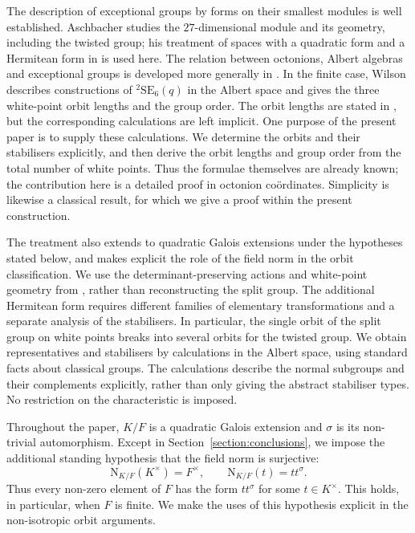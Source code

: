 \documentclass{amsart}
\def\NN{\mathord{\mathrm{N}}}
\newcommand{\SE}{\mathrm{SE}}
\newcommand{\s}{\sigma}
\theoremstyle{plain}
\numberwithin{theorem}{section}
\theoremstyle{definition}
\begin{document}
The description of exceptional groups by forms on their smallest
modules is well established. Aschbacher \cite{Asch1} studies the
$27$-dimensional module and its geometry, including the twisted group;
his treatment of spaces with a quadratic form and a Hermitean form in
\cite[Section~10]{Asch1} is used here. The relation between octonions,
Albert algebras and exceptional groups is developed more generally in
\cite{SprVeld}. In the finite case, Wilson
\cite[Sections~9--10]{WilsonAlbert} describes constructions of
${}^2\SE_6(q)$ in the Albert space and gives the three white-point orbit
lengths and the group order. The orbit lengths are stated in
\cite[Section~10]{WilsonAlbert}, but the corresponding calculations
are left implicit. One purpose of the present paper is to supply these
calculations. We determine the orbits and their stabilisers explicitly,
and then derive the orbit lengths and group order from the total
number of white points. Thus the formulae themselves are already
known; the contribution here is a detailed proof in octonion
co\"ordinates. Simplicity is likewise a classical result, for which we
give a proof within the present construction.

The treatment also extends to quadratic Galois extensions under the
hypotheses stated below, and makes explicit the role of the field norm
in the orbit classification.
We use the determinant-preserving actions and white-point geometry
from \cite{BSW1}, rather than reconstructing the split group. The
additional Hermitean form requires different families of elementary
transformations and a separate analysis of the stabilisers. In
particular, the single orbit of the split group on white points breaks
into several orbits for the twisted group. We obtain representatives
and stabilisers by calculations in the Albert space, using standard
facts about classical groups. The calculations describe the normal
subgroups and their complements explicitly, rather than only giving
the abstract stabiliser types. No restriction on the characteristic
is imposed.

Throughout the paper, $K/F$ is a quadratic Galois extension and $\sigma$ is its
non-trivial automorphism. Except in Section~\ref{section:conclusions}, we impose
the additional standing hypothesis that the
field norm is surjective:
\begin{equation}
\label{eq:1_norm_surjective}
\tag{N}
\NN_{K/F}(K^{\times})=F^{\times},\qquad
\NN_{K/F}(t)=tt^{\s}.
\end{equation}
Thus every non-zero element of $F$ has the form $tt^{\s}$ for some
$t\in K^{\times}$. This holds, in particular, when $F$ is finite. We make the
uses of this hypothesis explicit in the non-isotropic orbit arguments.
\end{document}
